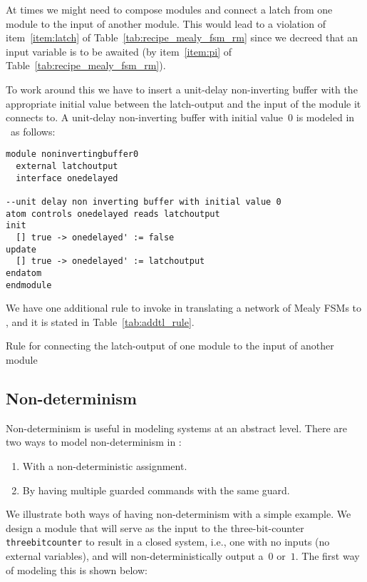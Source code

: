 At times we might need to compose modules and connect a latch from one
module to the input of another module. This would lead to a violation
of item~\ref{item:latch} of Table~\ref{tab:recipe_mealy_fsm_rm} since
we decreed that an input variable is to be awaited
(by item~\ref{item:pi} of Table~\ref{tab:recipe_mealy_fsm_rm}). 

To work around this we have to insert a unit-delay non-inverting
buffer with the appropriate initial value between the latch-output and
the input of the module it connects to. A unit-delay non-inverting
buffer with initial value~$0$ is modeled in \rem\ as follows:

\begin{verbatim}
module noninvertingbuffer0
  external latchoutput
  interface onedelayed

--unit delay non inverting buffer with initial value 0 
atom controls onedelayed reads latchoutput
init 
  [] true -> onedelayed' := false
update
  [] true -> onedelayed' := latchoutput
endatom 
endmodule
\end{verbatim}

We have one additional rule to invoke in translating a network of
Mealy FSMs to \rem, and it is stated in Table~\ref{tab:addtl_rule}. 

\begin{table}
\caption{Rule for connecting the latch-output of one module to the
input of another module}
\label{tab:addtl_rule}
\end{table}

\subsection{Non-determinism}
Non-determinism is useful in modeling systems at an abstract
level. There are two ways to model non-determinism in \rem:
\begin{enumerate}
\item With a non-deterministic assignment. 
\item By having multiple guarded commands with the same guard. 
\end{enumerate}

We illustrate both ways of having non-determinism with a simple
example. We design a module that will serve as the input to the
three-bit-counter {\tt threebitcounter} to result in a closed system,
i.e., one with no inputs (no external variables), and will
non-deterministically output a~$0$ or~$1$. The first way of modeling
this is shown below:

